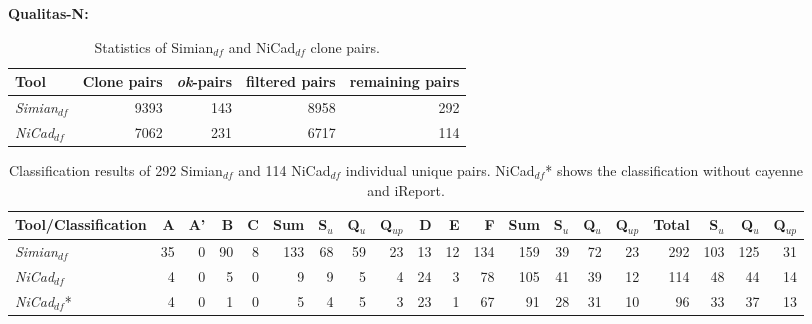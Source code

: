 \documentclass{IEEEtran}
\begin{document}

\textbf{Qualitas-N:} 

\begin{table}[H]
	\centering
	\caption{Statistics of Simian$_{df}$ and NiCad$_{df}$ clone pairs.}
	\label{tab:classification_indv_stats}
	\begin{tabular}{l|r|r|r|r}
		\hline 
		Tool & Clone pairs & \textit{ok}-pairs & filtered pairs & remaining pairs \\ 
		\hline 
		\multirow{1}{*}{\textit{Simian$_{df}$}} & 9393 & 143 & 8958 & 292 \\
		\hline
		\multirow{1}{*}{\textit{NiCad$_{df}$}} & 7062  & 231 & 6717 & 114 \\
		\hline
	\end{tabular} 
\end{table}

\begin{table}[H]
	\centering
	\caption{Classification results of 292 Simian$_{df}$ and 114 NiCad$_{df}$ individual unique pairs. NiCad$_{df}$* shows the classification without cayenne and iReport.}
	\label{tab:classification_indv}
	\begin{tabular}{|l|r|r|r|r|r|r|r|r|r|r|r|r|r|r|r|r|r|r|r|}
		\hline 
		Tool/Classification & A & A' & B & C & Sum & S$_{u}$ & Q$_{u}$ & Q$_{up}$ & D & E & F & Sum  & S$_{u}$ & Q$_{u}$ & Q$_{up}$ & Total & S$_{u}$ & Q$_{u}$  & Q$_{up}$  \\ 
		\hline 
		\multirow{1}{*}{\textit{Simian$_{df}$}} & 35 & 0 & 90 & 8 & 133 & 68 & 59 & 23 & 13 & 12 & 134 & 159 & 39 & 72 & 23 & 292 & 103 & 125 & 31 \\
		\hline
		\multirow{1}{*}{\textit{NiCad$_{df}$}} & 4  & 0 & 5 & 0 & 9 & 9 & 5 & 4 & 24 & 3 & 78 & 105 & 41 & 39 & 12 & 114 & 48 & 44 & 14 \\ 
		\hline
		\multirow{1}{*}{\textit{NiCad$_{df}$}*} & 4  & 0 & 1 & 0 & 5 & 4 & 5 & 3 & 23 & 1 & 67 & 91 & 28 & 31 & 10 & 96 & 33 & 37 & 13 \\ 
		\hline
	\end{tabular} 
\end{table}
\end{document}
